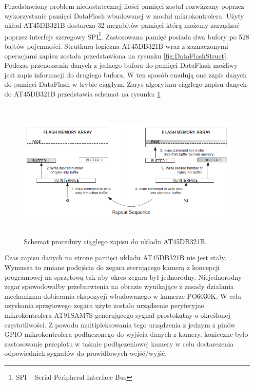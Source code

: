 Przedstawiony problem niedostatecznej ilości pamięci został rozwiązany poprzez wykorzystanie pamięci DataFlash wbudowanej w moduł mikrokontrolera. Użyty układ AT45DB321B\cite{AT45DB321BDataSheet} dostarcza 32 megabitów pamięci którą możemy zarządzać poprzez interfejs szeregowy SPI\footnote{SPI -- Serial Peripheral Interface Bus}. Zastosowana pamięć posiada dwa bufory po 528 bajtów pojemności. Strutkura logiczna AT45DB321B wraz z zaznaczonymi operacjami zapisu została przedstawiona na rysunku \ref{fig:DataFlashStruct}.  Podczas przenoszenia danych z jednego bufora do pamięci DataFlash możliwy jest zapis informacji do drugiego bufora. W ten sposób emulują one zapis danych do pamięci DataFlash w trybie ciągłym. Zarys algorytmu ciągłego zapisu danych do AT45DB321B przedstawia schemat na rysunku \ref{fig:DataFlashConstantWrite}

\begin{figure}[ht!]
 \centering \includegraphics[height=70mm]{../images/ch04/dataflash_constant_write.png}
 \caption{Schemat procedury ciągłego zapisu do układu AT45DB321B\cite{AT45DB321BApplicationNote}.}
 \label{fig:DataFlashConstantWrite}
\end{figure}

Czas zapisu danych na strone pamięci układu AT45DB321B nie jest stały. Wymusza to zmiane podejścia do zegara sterującego kamerą z koncepcji programowej na sprzętową tak aby okres zegara był jednorodny. Niejednorodny zegar spowodowałby przebarwienia na obrazie wynikające z zasady działania mechanizmu dobierania ekspozycji wbudowanego w kamerze PO6030K. W celu uzyskania sprzętowego zegara użyte zostało urządzenie peryferyjne mikrokontrolera AT91SAM7S generującego sygnał prostokątny o określonej częstotliwości. Z powodu multipleksowania tego urządzenia z jednym z pinów GPIO mikrokontrolera podłączonego do wyjścia danych z kamery, konieczne było zastosowanie przeplotu w taśmie podłączeniowej kamery w celu dostarczenia odpowiednich sygnałów do prawidłowych wejść/wyjść.

